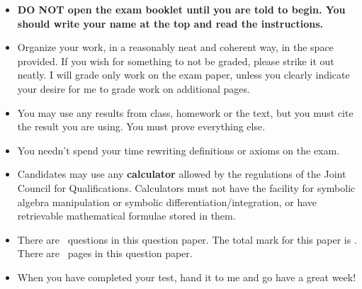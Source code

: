 \documentclass[11pt]{exam}
\begin{document}
\begin{minipage}[t]{3.7in}
\vspace{0pt}
\begin{itemize}

\item \textbf{DO NOT open the exam booklet until you are told to begin. You should write your name at the top and read the instructions.}

\vfill

\item Organize your work, in a reasonably neat and coherent way, in
the space provided. If you wish for something to not be graded, please strike it out neatly. I will grade only work on the exam paper, unless you clearly indicate your desire for me to grade work on additional pages.

\item You may use any results from class, homework or the text, but you must cite the result you are using. You must prove everything else.

\item You needn't spend your time rewriting definitions or axioms on the exam.

\item 
Candidates may use any \textbf{calculator} allowed by the regulations of the Joint
Council for Qualifications. Calculators must not have the facility for symbolic
algebra manipulation or symbolic differentiation/integration, or have
retrievable mathematical formulae stored in them.

\end{itemize}


\end{minipage}
\hfill
\begin{minipage}[t]{2.3in}
\vspace{0pt}
\addpoints %
\gradetable[v][questions]  %

\end{minipage}

\begin{itemize}
\item
There are \numquestions\ questions in this question paper. The total mark for this paper is \numpoints.
There are \numpages\ pages in this question paper. 



\item When you have completed your test, hand it to me and go have a great week!


\end{itemize}
\end{document}
